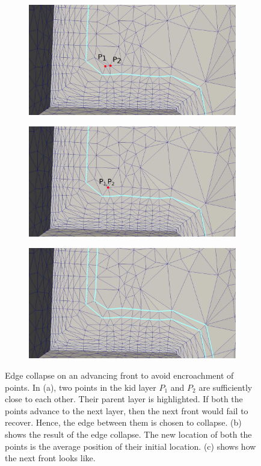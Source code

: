 \documentclass[conf]{new-aiaa}
\begin{document}
\begin{figure}[hbt!]
\centering
\begin{subfigure}{.5\textwidth}
  \centering
  \includegraphics[width=.9\linewidth]{edge-collapse/collapse1.eps}
  \caption{}
  \label{collapse1}
\end{subfigure}%
\begin{subfigure}{.5\textwidth}
  \centering
  \includegraphics[width=.9\linewidth]{edge-collapse/collapse2.eps}
  \caption{}
  \label{collapse2}
\end{subfigure}
\begin{subfigure}{.5\textwidth}
  \centering
  \includegraphics[width=.9\linewidth]{edge-collapse/collapse3.eps}
  \caption{}
  \label{collapse3}
\end{subfigure}
\caption{Edge collapse on an advancing front to avoid encroachment of points. In (a), two points in the kid layer $P_1$ and $P_2$ are sufficiently close to each other. Their parent layer is highlighted. If both the points advance to the next layer, then the next front would fail to recover. Hence, the edge between them is chosen to collapse. (b) shows the result of the edge collapse. The new location of both the points is the average position of their initial location. (c) shows how the next front looks like.}
\label{edge-collapse}
\end{figure}
\end{document}
